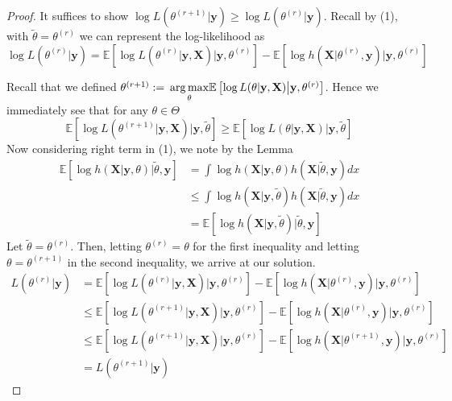 \documentclass{article}
\newcommand{\E}{{\mathbb{E}}}
\begin{document}
\begin{proof}
It suffices to show $\log L(\theta^{(r+1)}|\mathbf{y})\geq \log L(\theta^{(r)}|\mathbf{y})$. Recall by (1), with $\tilde{\theta} = \theta^{(r)}$ we can represent the log-likelihood as $$\log L(\theta^{(r)}|\mathbf{y}) = \E\left[\log L(\theta^{(r)}|\mathbf{y},\mathbf{X})\big|\mathbf{y},\theta^{(r)}\right] - \E\left[\log h(\mathbf{X}|\theta^{(r)},\mathbf{y})\big| \mathbf{y},\theta^{(r)}\right]$$

Recall that we defined $\theta^{(r+1)}:=\hspace{.2em}\underset{\theta}{\arg\max}\E\left[\log L(\theta|\mathbf{y},\mathbf{X})\big|\mathbf{y},\theta^{(r)}\right]$. Hence we immediately see that for any $\theta\in\Theta$ $$\E\left[\log L(\theta^{(r+1)}|\mathbf{y},\mathbf{X})\big|\mathbf{y},\tilde{\theta}\right]\geq \E\left[\log L(\theta|\mathbf{y},\mathbf{X})\big|\mathbf{y},\tilde{\theta}\right]$$ 
Now considering right term in (1), we note by the Lemma 
\begin{align*}
\E\left[\log h(\mathbf{X}|\mathbf{y},\theta)\big|\tilde{\theta},\mathbf{y}\right] &= \int \log h(\mathbf{X}|\mathbf{y},\theta) h(\mathbf{X}|\tilde{\theta},\mathbf{y})dx\\
&\leq \int \log h(\mathbf{X}|\mathbf{y},\tilde{\theta}) h(\mathbf{X}|\tilde{\theta},\mathbf{y})dx\\
&= \E\left[\log h(\mathbf{X}|\mathbf{y},\tilde{\theta})\big|\tilde{\theta},\mathbf{y}\right]
\end{align*}
Let $\tilde{\theta} = \theta^{(r)}$. Then, letting $\theta^{(r)} = \theta$ for the first inequality and letting $\theta = \theta^{(r+1)}$ in the second inequality, we arrive at our solution. 
\begin{align*}
L(\theta^{(r)}|\mathbf{y}) &=  \E\left[\log L(\theta^{(r)}|\mathbf{y},\mathbf{X})\big|\mathbf{y},\theta^{(r)}\right] - \E\left[\log h(\mathbf{X}|\theta^{(r)},\mathbf{y})\big| \mathbf{y},\theta^{(r)}\right]\\
&\leq \E\left[\log L(\theta^{(r+1)}|\mathbf{y},\mathbf{X})\big|\mathbf{y},\theta^{(r)}\right] - \E\left[\log h(\mathbf{X}|\theta^{(r)},\mathbf{y})\big| \mathbf{y},\theta^{(r)}\right]\\
&\leq \E\left[\log L(\theta^{(r+1)}|\mathbf{y},\mathbf{X})\big|\mathbf{y},\theta^{(r)}\right] - \E\left[\log h(\mathbf{X}|\theta^{(r+1)},\mathbf{y})\big| \mathbf{y},\theta^{(r)}\right]\\
&= L(\theta^{(r+1)}|\mathbf{y})
\end{align*}

\end{proof}
\end{document}
